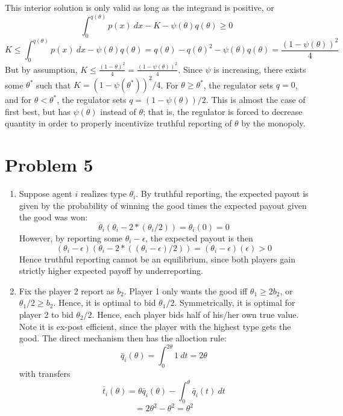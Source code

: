 \documentclass[10pt,letter]{article}
\begin{document}
\begin{enumerate}[label=(\alph*)]
This interior solution is only valid as long as the integrand is positive, or
\[ \int_0^{q(\theta)}p(x) \ dx - K - \psi(\theta) q(\theta) \ge 0 \]
\[ K \le \int_0^{q(\theta)}p(x) \ dx - \psi(\theta) q(\theta) = q(\theta) - q(\theta)^2 - \psi(\theta)q(\theta) = \frac{(1-\psi(\theta))^2}{4} \]
But by assumption, $K \le \frac{(1-\underline{\theta})^2}{4} = \frac{(1-\psi(\underline{\theta}))^2}{4}$. Since $\psi$ is increasing, there exists some $\theta^*$ such that $K = (1-\psi(\theta^*))^2/4$. For $\theta \ge \theta^*$, the regulator sets $q = 0$, and for $\theta < \theta^*$, the regulator sets $q = (1-\psi(\theta))/2$.
This is almost the case of first best, but has $\psi(\theta)$ instead of $\theta$; that is, the regulator is forced to decrease quantity in order to properly incentivize truthful reporting of $\theta$ by the monopoly.
\end{enumerate}
\section*{Problem 5}
\begin{enumerate}[label=(\alph*)]
\item Suppose agent $i$ realizes type $\theta_i$. By truthful reporting, the expected payout is given by the probability of winning the good times the expected payout given the good was won:
\[ \theta_i \left(\theta_i - 2 * (\theta_i/2)\right) = \theta_i (0) = 0 \]
However, by reporting some $\theta_i - \epsilon$, the expected payout is then
\[ (\theta_i - \epsilon) \left(\theta_i  - 2 * ((\theta_i - \epsilon)/2)\right) = (\theta_i - \epsilon) (\epsilon) > 0 \]
Hence truthful reporting cannot be an equilibrium, since both players gain strictly higher expected payoff by underreporting.
\item Fix the player 2 report as $b_2$. Player 1 only wants the good iff $\theta_1 \ge 2b_2$, or $\theta_1/2 \ge b_2$. Hence, it is optimal to bid $\theta_1/2$. Symmetrically, it is optimal for player 2 to bid $\theta_2/2$. Hence, each player bids half of his/her own true value. Note it is ex-post efficient, since the player with the highest type gets the good. The direct mechanism then has the alloction rule:
\[ \bar{q}_i(\theta) = \int_0^{2\theta} 1 \ dt = 2\theta  \]
with transfers
\[ \bar{t}_i(\theta) = \theta \bar{q}_i(\theta) - \int_0^\theta \bar{q}_i(t) \ dt \]
\[ = 2\theta^2 - \theta^2 = \theta^2 \]
\end{enumerate}
\end{document}

